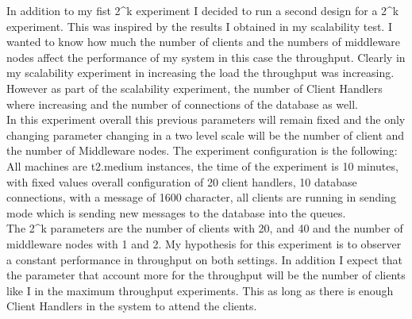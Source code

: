 In addition to my fist 2\^{}k experiment I decided to run a second design for a 2\^{}k experiment. This was inspired by the results I obtained in my scalability test. I wanted to know how much the number of clients and the numbers of middleware nodes affect the performance of my system in this case the throughput. Clearly in my scalability experiment in increasing the load the throughput was increasing. However as part of the scalability experiment, the number of Client Handlers where increasing and the number of connections of the database as well.\\ 

In this experiment overall this previous parameters will remain fixed and the only changing parameter changing in a two level scale will be the number of client and the number of Middleware nodes. The experiment configuration is the following:\\

All machines are t2.medium instances, the time of the experiment is 10 minutes, with fixed values overall configuration of 20 client handlers, 10 database connections, with a message of 1600 character, all clients are running in sending mode which is sending new messages to the database into the queues.\\

The 2\^{}k parameters are the number of clients with 20, and 40 and the number of middleware nodes with 1 and 2. My hypothesis for this experiment is to observer a constant performance in throughput on both settings. In addition I expect that the parameter that account more for the throughput will be the number of clients like I in the maximum throughput experiments. This as long as there is enough Client Handlers in the system to attend the clients.\\

\begin{table}[h]\centering
         \caption{Throughput metric results for different settings of the $2^k $ experiment with clients and middlewares}
         \label{2k2}
 \end{table}  
 
